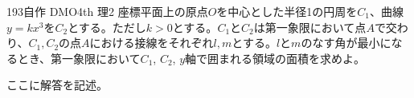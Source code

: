 \begin{prob}{193}{\maru}{自作 DMO4th 理2}
 座標平面上の原点$O$を中心とした半径1の円周を$C_1$、曲線$y=kx^3$を$C_2$とする。ただし$k>0$とする。$C_1$と$C_2$は第一象限において点$A$で交わり、$C_1, C_2$の点$A$における接線をそれぞれ$l, m$とする。$l$と$m$のなす角が最小になるとき、第一象限において$C_1$, $C_2$, $y$軸で囲まれる領域の面積を求めよ。
\end{prob}
ここに解答を記述。